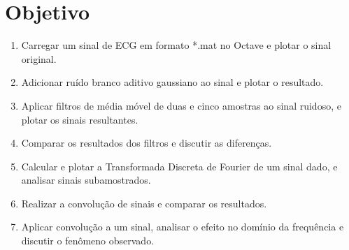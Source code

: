 \section{Objetivo}
\begin{enumerate}
    \item Carregar um sinal de ECG em formato *.mat no Octave e plotar o sinal original.
    \item Adicionar ruído branco aditivo gaussiano ao sinal e plotar o resultado.
    \item Aplicar filtros de média móvel de duas e cinco amostras ao sinal ruidoso, e plotar os sinais resultantes.
    \item Comparar os resultados dos filtros e discutir as diferenças.
    \item Calcular e plotar a Transformada Discreta de Fourier de um sinal dado, e analisar sinais subamostrados.
    \item Realizar a convolução de sinais e comparar os resultados.
    \item Aplicar convolução a um sinal, analisar o efeito no domínio da frequência e discutir o fenômeno observado.
\end{enumerate}
